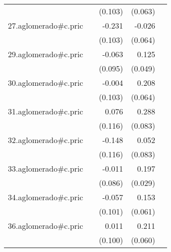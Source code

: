 {\begin{longtable}{l*{4}{D{.}{.}{-1}}}
            &                     &     (0.103)         &     (0.063)         &                     \\
\addlinespace
27.aglomerado#c.pric&                     &      -0.231\sym{*}  &      -0.026         &                     \\
            &                     &     (0.103)         &     (0.064)         &                     \\
\addlinespace
29.aglomerado#c.pric&                     &      -0.063         &       0.125\sym{*}  &                     \\
            &                     &     (0.095)         &     (0.049)         &                     \\
\addlinespace
30.aglomerado#c.pric&                     &      -0.004         &       0.208\sym{**} &                     \\
            &                     &     (0.103)         &     (0.064)         &                     \\
\addlinespace
31.aglomerado#c.pric&                     &       0.076         &       0.288\sym{***}&                     \\
            &                     &     (0.116)         &     (0.083)         &                     \\
\addlinespace
32.aglomerado#c.pric&                     &      -0.148         &       0.052         &                     \\
            &                     &     (0.116)         &     (0.083)         &                     \\
\addlinespace
33.aglomerado#c.pric&                     &      -0.011         &       0.197\sym{***}&                     \\
            &                     &     (0.086)         &     (0.029)         &                     \\
\addlinespace
34.aglomerado#c.pric&                     &      -0.057         &       0.153\sym{*}  &                     \\
            &                     &     (0.101)         &     (0.061)         &                     \\
\addlinespace
36.aglomerado#c.pric&                     &       0.011         &       0.211\sym{***}&                     \\
            &                     &     (0.100)         &     (0.060)         &                     \\

\end{longtable}}
